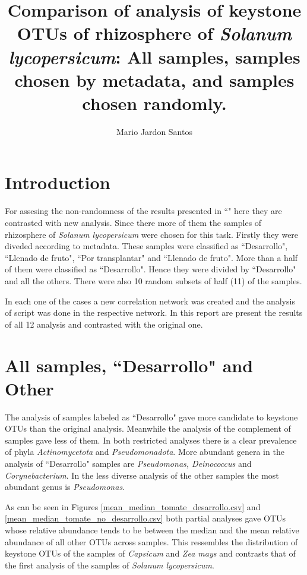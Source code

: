 \documentclass{article}
\title{Comparison of analysis of keystone OTUs of rhizosphere of \textit{Solanum lycopersicum}: All samples, samples chosen by metadata, and samples chosen randomly.}
\author{Mario Jardon Santos}
\date{}
\begin{document}
\maketitle

\section{Introduction}
\label{intro}

For assesing the non-randomness of the results presented in ``" here they are contrasted with new analysis. 
Since there more of them the samples of rhizosphere of \textit{Solanum lycopersicum} were chosen for this task.
Firstly they were diveded according to metadata. 
These samples were classified as ``Desarrollo", ``Llenado de fruto", ``Por transplantar" and ``Llenado de fruto".
More than a half of them were classified as ``Desarrollo".
Hence they were divided by ``Desarrollo" and all the others.
There were also 10 random subsets of half (11) of the samples.

In each one of the cases a new correlation network was created and the analysis of script was done in the respective network. 
In this report are present the results of all 12 analysis and contrasted with the original one.

\section{All samples, ``Desarrollo" and Other}
\label{des_vs_no_des}

The analysis of samples labeled as ``Desarrollo" gave more candidate to keystone OTUs  than the original analysis.
Meanwhile the analysis of the complement of samples gave less of them.
In both restricted analyses there is a clear prevalence of phyla \textit{Actinomycetota} and \textit{Pseudomonadota}. 
More abundant genera in the analysis of ``Desarrollo" samples are \textit{Pseudomonas, Deinococcus} and \textit{Corynebacterium}. 
In the less diverse analysis of the other samples the most abundant genus is \textit{Pseudomonas}. 

As can be seen in Figures \ref{mean_median_tomate_desarrollo.csv} and  \ref{mean_median_tomate_no_desarrollo.csv} both partial analyses gave OTUs whose relative abundance tends to be between the median and the mean relative abundance of all other OTUs across samples.
This ressembles the distribution of keystone OTUs of the samples of \textit{Capsicum} and \textit{Zea mays} and contrasts that of the first analysis of the samples of \textit{Solanum lycopersicum}.
\end{document}
